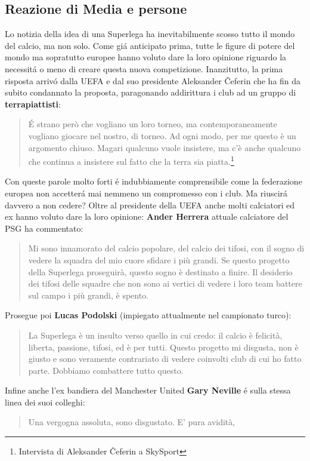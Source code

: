 \documentclass[
    corpo=12pt,
    oneside,
    evenboxes,
    tipotesi=triennale,
    stile=classica,
    oldstyle,
    autoretitolo,
    greek,
]{toptesi}
\begin{document}
\begin{interlinea}{1.5}
\section{Reazione di Media e persone}
Lo notizia della idea di una Superlega ha inevitabilmente scosso tutto il mondo del calcio, ma non solo. Come gi\'a anticipato prima,
tutte le figure di potere del mondo ma sopratutto europee hanno voluto dare la loro opinione riguardo la necessit\'a o meno di creare questa nuova competizione.
Inanzitutto, la prima risposta arriv\'o dalla UEFA e dal suo presidente Aleksander Čeferin che ha fin da subito condannato la proposta, paragonando
addirittura i club ad un gruppo di \textbf{terrapiattisti}: \begin{quote}\small \'E strano però che vogliano un loro torneo, ma contemporaneamente vogliano giocare nel nostro, 
di torneo. Ad ogni modo, per me questo è un argomento chiuso. Magari qualcuno vuole insistere, ma c’è anche qualcuno che continua a insistere sul fatto 
che la terra sia piatta.\footnote{Intervista di Aleksander Čeferin a SkySport}\end{quote} Con queste parole molto forti \'e indubbiamente comprensibile come la federazione europea non accetter\'a mai 
nemmeno un compromesso con i club. Ma riuscir\'a davvero a non cedere?\newline
Oltre al presidente della UEFA anche molti calciatori ed ex hanno voluto dare la loro opinione: \textbf{Ander Herrera} attuale calciatore del PSG ha commentato: 
\begin{quote}\small Mi sono innamorato del calcio popolare, del calcio dei tifosi, con il sogno di vedere la squadra del mio cuore sfidare i più grandi. Se questo progetto 
della Superlega proseguirà, questo sogno è destinato a finire. Il desiderio dei tifosi delle squadre che non sono ai vertici di vedere i loro team battere 
sul campo i più grandi, è spento.\end{quote} Prosegue poi \textbf{Lucas Podolski} (impiegato attualmente nel campionato turco): \begin{quote}\small La Superlega è un insulto verso quello 
in cui credo: il calcio è felicità, liberta, passione, tifosi, ed è per tutti. Questo progetto mi disgusta, non è giusto e sono veramente contrariato di vedere coinvolti 
club di cui ho fatto parte. Dobbiamo combattere tutto questo.\end{quote}
Infine anche l'ex bandiera del Manchester United \textbf{Gary Neville} \'e sulla \linebreak stessa linea dei suoi colleghi: \begin{quote}\small Una vergogna assoluta, sono disgustato. E' pura avidità,

\end{quote}
\end{interlinea}
\end{document}
